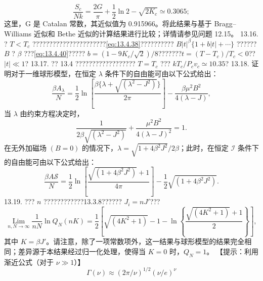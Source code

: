 \begin{equation}\tag{13.7.36}\label{eq:13.7.36}
\frac { S _ { c } } { N k } = \frac { 2 G } { \pi } + \frac { 1 } { 2 } \ln 2 - \sqrt { 2 K _ { c } } \simeq 0 . 30 65 ;
\end{equation}
这里，G 是 Catalan 常数，其近似值为 0.915966。将此结果与基于 Bragg--Williams 近似和 Bethe 近似的计算结果进行比较；详情请参见问题 12.15。
13.16. ? \(T < T_c\) ??????????????????????\autoref{eq:13.4.38}?????????? \(B|t|^{\beta}\{1+b|t|+\cdots\}\) ?????? \(B\) ? \(\beta\) ???\autoref{eq:13.4.40}????? \(b = (1-9K_c/\sqrt{2})/8\)???????\(t = (T - T_c)/T_c < 0\)?? \(|t| \ll 1\)?
13.17. ?? 13.4 ?????????????????? \(T = T_{c}\) ??? \(kT_{c}/P_{c}v_{c} \simeq 10.35\)?
13.18. 证明对于一维球形模型，在恒定 \(\lambda\) 条件下的自由能可由以下公式给出：
\begin{equation}\tag{13.7.37}\label{eq:13.7.37}
\frac { \beta A _ { \lambda } } { N } = \frac { 1 } { 2 } \ln \left[ \frac { \beta \{ \lambda + \sqrt { ( \lambda ^{2} - J ^{2} ) } \} } { 2 \pi } \right] - \frac { \beta \mu ^{2} B ^{2} } { 4 ( \lambda - J ) } ,
\end{equation}
当 \(\lambda\) 由约束方程决定时，
\begin{equation}\tag{13.7.38}\label{eq:13.7.38}
\frac { 1 } { 2 \beta \sqrt { ( \lambda ^{2} - J ^{2} ) } } + \frac { \mu ^{2} B ^{2} } { 4 ( \lambda - J ) ^{2} } = 1 .
\end{equation}
在无外加磁场 \((B=0)\) 的情况下，\(\lambda = \sqrt{1+4\beta^{2}J^{2}}/2\beta\)；此时，在恒定 \(\mathcal{I}\) 条件下的自由能可由以下公式给出：
\begin{equation}\tag{13.7.39}\label{eq:13.7.39}
\frac { \beta A \mathcal { S } } { N } = \frac { 1 } { 2 } \ln \left[ \frac { \sqrt { ( 1 + 4 \beta ^{2} J ^{2} ) } + 1 } { 4 \pi } \right] - \frac { 1 } { 2 } \sqrt { ( 1 + 4 \beta ^{2} J ^{2} ) } .
\end{equation}
13.19. ??? \(n\) ????????????13.3.8?????? \(J_i = nJ\prime\)???
\begin{equation}\tag{13.7.40}\label{eq:13.7.40}
\operatorname * { L i m } _ { n , N \rightarrow \infty } \frac { 1 } { n N } \ln Q _ { N } ( n K ) = \frac { 1 } { 2 } \left[ \sqrt { ( 4 K ^{2} + 1 ) } - 1 - \ln \left\{ \frac { \sqrt { ( 4 K ^{2} + 1 ) } + 1 } { 2 } \right\} \right] ,
\end{equation}
其中 \(K = \beta J'\)。请注意，除了一项常数项外，这一结果与球形模型的结果完全相同；差异源于本结果经过归一化处理，使得当 \(K=0\) 时，\(Q_N=1\)。
【提示：利用渐近公式（对于 \(\nu \gg 1\)）】
\begin{equation}\tag{13.7.41}\label{eq:13.7.41}
\Gamma ( \nu ) \approx ( 2 \pi / \nu ) ^{1 / 2} ( \nu / e ) ^{\nu}
\end{equation}
